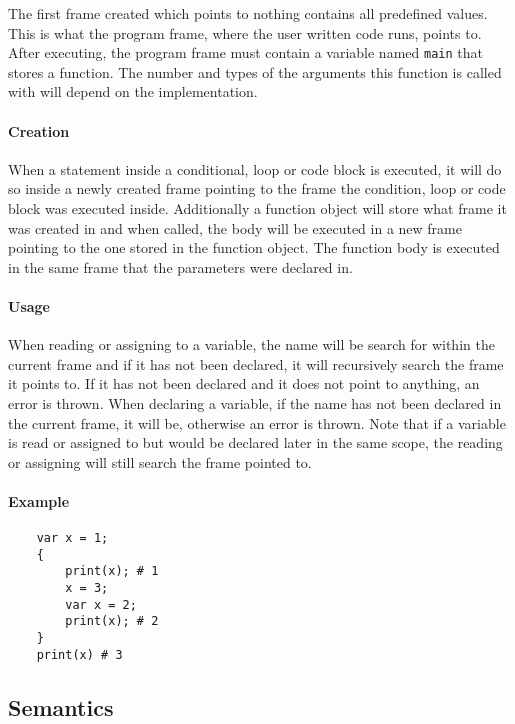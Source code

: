 The first frame created which points to nothing contains all predefined values. This is what the program frame, where the user written code runs, points to. After executing, the program frame must contain a variable named \verb|main| that stores a function. The number and types of the arguments this function is called with will depend on the implementation.

\paragraph{Creation}

When a statement inside a conditional, loop or code block is executed, it will do so inside a newly created frame pointing to the frame the condition, loop or code block was executed inside. Additionally a function object will store what frame it was created in and when called, the body will be executed in a new frame pointing to the one stored in the function object. The function body is executed in the same frame that the parameters were declared in.

\paragraph{Usage}

When reading or assigning to a variable, the name will be search for within the current frame and if it has not been declared, it will recursively search the frame it points to. If it has not been declared and it does not point to anything, an error is thrown. When declaring a variable, if the name has not been declared in the current frame, it will be, otherwise an error is thrown. Note that if a variable is read or assigned to but would be declared later in the same scope, the reading or assigning will still search the frame pointed to.

\paragraph{Example}

\begin{verbatim}
    var x = 1;
    {
        print(x); # 1
        x = 3;
        var x = 2;
        print(x); # 2
    }
    print(x) # 3
\end{verbatim}

\subsection{Semantics}

